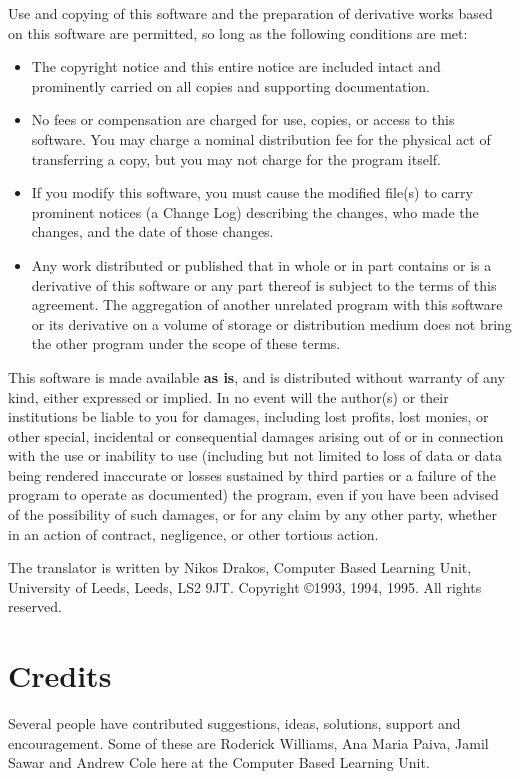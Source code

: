 Use and copying of this software and the preparation of derivative
works based on this software are permitted, so long as the following
conditions are met:
\begin{itemize}
\item The copyright notice and this entire notice are included intact
and prominently carried on all copies and supporting documentation.
\item No fees or compensation are charged for use, copies, or
access to this software. You may charge a nominal
distribution fee for the physical act of transferring a
copy, but you may not charge for the program itself. 
\item If you modify this software, you must cause the modified
file(s) to carry prominent notices (a Change Log)
describing the changes, who made the changes, and the date
of those changes.
\item  Any work distributed or published that in whole or in part
contains or is a derivative of this software or any part 
thereof is subject to the terms of this agreement. The 
aggregation of another unrelated program with this software
or its derivative on a volume of storage or distribution
medium does not bring the other program under the scope
of these terms.
\end{itemize}
 
This software is made available {\bf as is}, and is distributed without 
warranty of any kind, either expressed or implied.
In no event will the author(s) or their institutions be liable to you
for damages, including lost profits, lost monies, or other special,
incidental or consequential damages arising out of or in connection
with the use or inability to use (including but not limited to loss of
data or data being rendered inaccurate or losses sustained by third
parties or a failure of the program to operate as documented) the 
program, even if you have been advised of the possibility of such
damages, or for any claim by any other party, whether in an action of
contract, negligence, or other tortious action.

The \latextohtml translator is written by Nikos Drakos, 
Computer Based Learning Unit,  University of Leeds,  Leeds,  LS2 9JT.
Copyright \copyright 1993, 1994, 1995. All rights reserved.
 
\section{Credits}
Several people have contributed suggestions, ideas, solutions, support
and encouragement. Some of these are Roderick Williams, Ana Maria
Paiva, Jamil Sawar and Andrew Cole here at the Computer Based Learning Unit.


